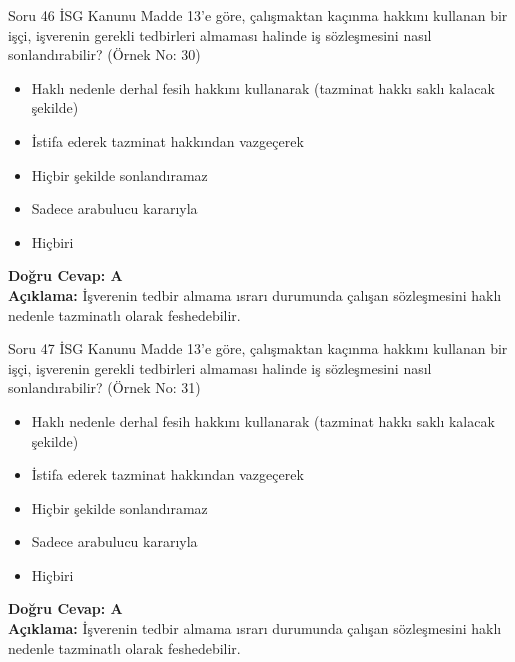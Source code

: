 \documentclass[12pt,a4paper]{article}
\begin{document}
\begin{testcard}{Soru 46}
    İSG Kanunu Madde 13'e göre, çalışmaktan kaçınma hakkını kullanan bir işçi, işverenin gerekli tedbirleri almaması halinde iş sözleşmesini nasıl sonlandırabilir? (Örnek No: 30)
    \begin{itemize}
        \item[A)] Haklı nedenle derhal fesih hakkını kullanarak (tazminat hakkı saklı kalacak şekilde)
        \item[B)] İstifa ederek tazminat hakkından vazgeçerek
        \item[C)] Hiçbir şekilde sonlandıramaz
        \item[D)] Sadece arabulucu kararıyla
        \item[E)] Hiçbiri
    \end{itemize}
    \tcblower
    \textbf{Doğru Cevap: A} \\
    \textbf{Açıklama:} İşverenin tedbir almama ısrarı durumunda çalışan sözleşmesini haklı nedenle tazminatlı olarak feshedebilir.
\end{testcard}

\begin{testcard}{Soru 47}
    İSG Kanunu Madde 13'e göre, çalışmaktan kaçınma hakkını kullanan bir işçi, işverenin gerekli tedbirleri almaması halinde iş sözleşmesini nasıl sonlandırabilir? (Örnek No: 31)
    \begin{itemize}
        \item[A)] Haklı nedenle derhal fesih hakkını kullanarak (tazminat hakkı saklı kalacak şekilde)
        \item[B)] İstifa ederek tazminat hakkından vazgeçerek
        \item[C)] Hiçbir şekilde sonlandıramaz
        \item[D)] Sadece arabulucu kararıyla
        \item[E)] Hiçbiri
    \end{itemize}
    \tcblower
    \textbf{Doğru Cevap: A} \\
    \textbf{Açıklama:} İşverenin tedbir almama ısrarı durumunda çalışan sözleşmesini haklı nedenle tazminatlı olarak feshedebilir.
\end{testcard}
\end{document}
